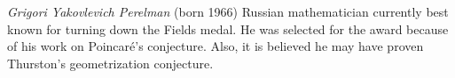 \documentclass[12pt]{article}
\begin{document}
\emph{Grigori Yakovlevich Perelman} (born 1966) Russian mathematician currently best known for turning down the Fields medal. He was selected for the award because of his work on Poincar\'e's conjecture. Also, it is believed he may have proven Thurston's geometrization conjecture.
\end{document}
